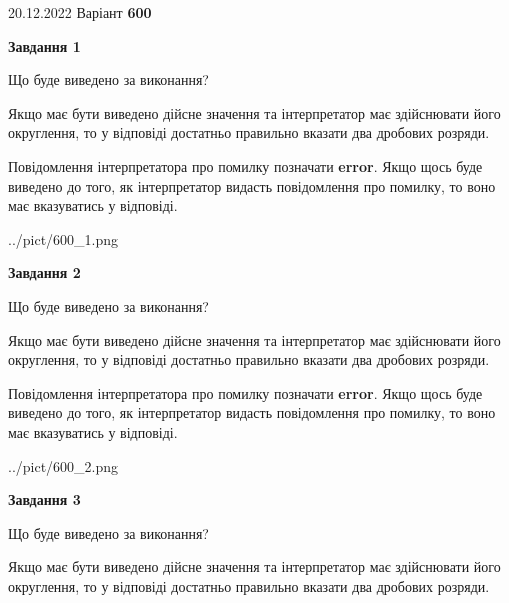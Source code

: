 \documentclass[12pt, ukrainian]{article}
\begin{document}
{20.12.2022 Варіант \No \textbf { 600 }\par}
{
\begin {Large}

{\begin {center}\textbf{Завдання 1}\end {center}}\par
Що буде виведено за виконання? \par

Якщо має бути виведено дійсне значення та інтерпретатор має здійснювати його округлення, 
то у відповіді достатньо правильно вказати два дробових розряди.

Повідомлення інтерпретатора про помилку позначати \textbf{error}.
Якщо щось буде виведено до того, як інтерпретатор видасть повідомлення про помилку, 
то воно має вказуватись у відповіді. \par

\begin{center}
	{../pict/600_1.png}
\end{center}
\newpage

{\begin {center}\textbf{Завдання 2}\end {center}}\par
Що буде виведено за виконання? \par

Якщо має бути виведено дійсне значення та інтерпретатор має здійснювати його округлення, 
то у відповіді достатньо правильно вказати два дробових розряди.

Повідомлення інтерпретатора про помилку позначати \textbf{error}.
Якщо щось буде виведено до того, як інтерпретатор видасть повідомлення про помилку, 
то воно має вказуватись у відповіді. \par

\begin{center}
	{../pict/600_2.png}
\end{center}
\newpage

{\begin {center}\textbf{Завдання 3}\end {center}}\par
Що буде виведено за виконання? \par

Якщо має бути виведено дійсне значення та інтерпретатор має здійснювати його округлення, 
то у відповіді достатньо правильно вказати два дробових розряди.


\end{Large}}
\end{document}
